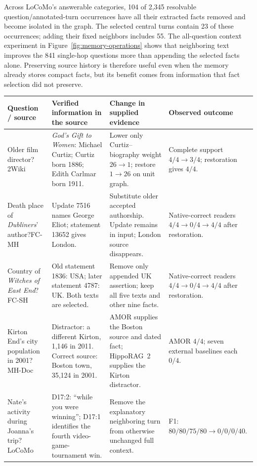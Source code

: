 Across LoCoMo's answerable categories, 104 of 2,345 resolvable question/annotated-turn occurrences have all their extracted facts removed and become isolated in the graph.
The selected central turns contain 23 of these occurrences; adding their fixed neighbors includes 55.
The all-question context experiment in Figure~\ref{fig:memory-operations} shows that neighboring text improves the 841 single-hop questions more than appending the selected facts alone.
Preserving source history is therefore useful even when the memory already stores compact facts, but its benefit comes from information that fact selection did not preserve.

\begin{table}[t]
\centering
\small
\setlength{\tabcolsep}{4pt}
\begin{tabular}{p{}p{}p{}p{}}
\toprule
Question / source & Verified information in the source & Change in supplied evidence & Observed outcome \\
\midrule
Older film director?\newline 2Wiki & \emph{God's Gift to Women}: Michael Curtiz; Curtiz born 1886; Edith Carlmar born 1911. & Lower only Curtiz--biography weight $26\to1$; restore $1\to26$ on unit graph. & Complete support $4/4\to3/4$; restoration gives $4/4$. \\
\addlinespace[3pt]
Death place of \emph{Dubliners}' author?\newline FC-MH & Update 7516 names George Eliot; statement 13652 gives London. & Substitute older accepted authorship. Update remains in input; London source disappears. & Native-correct readers $4/4\to0/4\to4/4$ after restoration. \\
\addlinespace[3pt]
Country of \emph{Witches of East End}?\newline FC-SH & Old statement 1836: USA; later statement 4787: UK. Both texts are selected. & Remove only appended UK assertion; keep all five texts and other nine facts. & Native-correct readers $4/4\to0/4\to4/4$ after restoration. \\
\addlinespace[3pt]
Kirton End's city population in 2001?\newline MH-Doc & Distractor: a different Kirton, 1,146 in 2011. Correct source: Boston town, 35,124 in 2001. & AMOR supplies the Boston source and dated fact; HippoRAG~2 supplies the Kirton distractor. & AMOR $4/4$; seven external baselines each $0/4$. \\
\addlinespace[3pt]
Nate's activity during Joanna's trip?\newline LoCoMo & D17:2: ``while you were winning''; D17:1 identifies the fourth video-game-tournament win. & Remove the explanatory neighboring turn from otherwise unchanged full context. & F1: $80/80/75/80\to0/0/0/40$. \\

\end{tabular}
\end{table}
